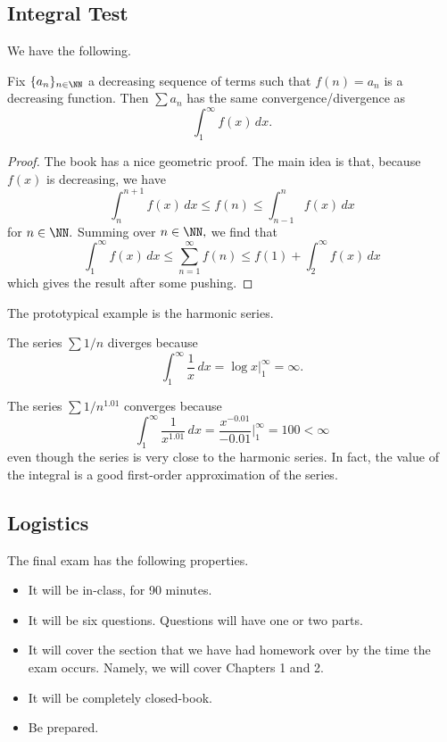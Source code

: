 \documentclass[../notes.tex]{subfiles}
\begin{document}
\subsection{Integral Test}
We have the following.
\begin{prop}
	Fix $\{a_n\}_{n\in\NN}$ a decreasing sequence of terms such that $f(n)=a_n$ is a decreasing function. Then $\sum a_n$ has the same convergence/divergence as
	\[\int_1^\infty f(x)\,dx.\]
\end{prop}
\begin{proof}
	The book has a nice geometric proof. The main idea is that, because $f(x)$ is decreasing, we have
	\[\int_n^{n+1}f(x)\,dx\le f(n)\le\int_{n-1}^nf(x)\,dx\]
	for $n\in\NN.$ Summing over $n\in\NN,$ we find that
	\[\int_1^\infty f(x)\,dx\le\sum_{n=1}^\infty f(n)\le f(1)+\int_2^\infty f(x)\,dx\]
	which gives the result after some pushing.
\end{proof}
The prototypical example is the harmonic series.
\begin{example}
	The series $\sum1/n$ diverges because
	\[\int_1^\infty\frac1x\,dx=\log x\bigg|_1^\infty=\infty.\]
\end{example}
\begin{example}
	The series $\sum1/n^{1.01}$ converges because
	\[\int_1^{\infty}\frac1{x^{1.01}}\,dx=\frac{x^{-0.01}}{-0.01}\bigg|_1^\infty=100<\infty\]
	even though the series is very close to the harmonic series. In fact, the value of the integral is a good first-order approximation of the series.
\end{example}

\subsection{Logistics}
The final exam has the following properties.
\begin{itemize}
	\item It will be in-class, for 90 minutes.
	\item It will be six questions. Questions will have one or two parts.
	\item It will cover the section that we have had homework over by the time the exam occurs. Namely, we will cover Chapters 1 and 2.
	\item It will be completely closed-book.
	\item Be prepared.
\end{itemize}
\end{document}
